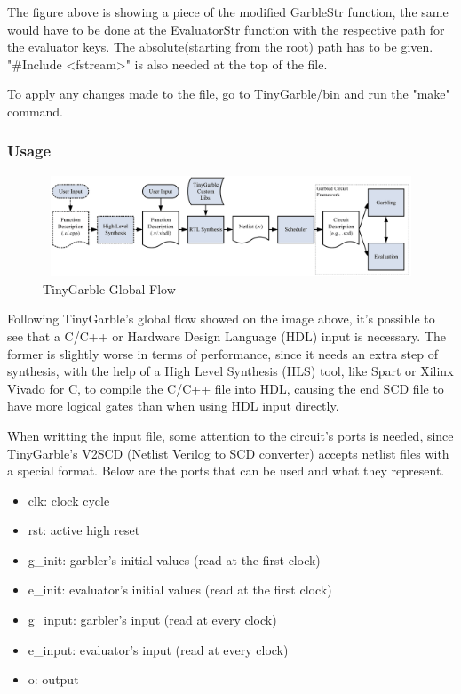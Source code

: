 \begin{refsection}
The figure above is showing a piece of the modified GarbleStr function, the same would have to be done at the EvaluatorStr function with the respective path for the evaluator keys. The absolute(starting from the root) path has to be given. "\#Include <fstream>" is also needed at the top of the file.

To apply any changes made to the file, go to TinyGarble/bin and run the "make" command.

\newpage

\subsubsection{Usage}

\begin{figure}[H]
	\centering
	\includegraphics[width=1\textwidth, height=3cm]{./sdf/secure_multiparty_computation/figures/tiny_garble_flow.png}
    \caption{TinyGarble Global Flow\cite{Songhori}}\label{fig:tinygarble_flow}
\end{figure}

Following TinyGarble's global flow showed on the image above, it's possible to see that a C/C++ or Hardware Design Language (HDL) input is necessary. The former is slightly worse in terms of performance, since it needs an extra step of synthesis, with the help of a High Level Synthesis (HLS) tool, like Spart or Xilinx Vivado for C, to compile the C/C++ file into HDL, causing the end SCD file to have more logical gates than when using HDL input directly.

When writting the input file, some attention to the circuit's ports is needed, since TinyGarble's V2SCD (Netlist Verilog to SCD converter) accepts netlist files with a special format.
Below are the ports that can be used and what they represent.

\begin{itemize}
\item clk: clock cycle
\item rst: active high reset
\item g\_init: garbler's initial values (read at the first clock)
\item e\_init: evaluator's initial values (read at the first clock)
\item g\_input: garbler's input (read at every clock)
\item e\_input: evaluator's input (read at every clock)
\item o: output
\end{itemize}


\end{refsection}
